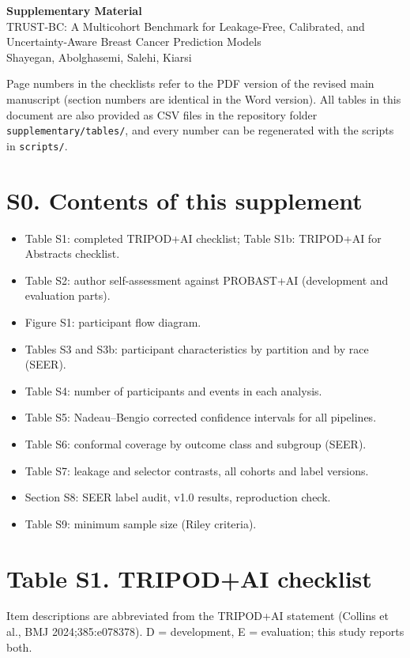\documentclass[10pt,a4paper]{article}
\begin{document}
\begin{center}
{\Large\bfseries Supplementary Material}\\[4pt]
{\large TRUST-BC: A Multicohort Benchmark for Leakage-Free, Calibrated, and Uncertainty-Aware Breast Cancer Prediction Models}\\[6pt]
Shayegan, Abolghasemi, Salehi, Kiarsi
\end{center}

\noindent Page numbers in the checklists refer to the PDF version of the revised main manuscript (section numbers are identical in the Word version). All tables in this document are also provided as CSV files in the repository folder \texttt{supplementary/tables/}, and every number can be regenerated with the scripts in \texttt{scripts/}.

\tableofcontents
\bigskip

\section*{S0. Contents of this supplement}
\begin{itemize}
\item Table S1: completed TRIPOD+AI checklist; Table S1b: TRIPOD+AI for Abstracts checklist.
\item Table S2: author self-assessment against PROBAST+AI (development and evaluation parts).
\item Figure S1: participant flow diagram.
\item Tables S3 and S3b: participant characteristics by partition and by race (SEER).
\item Table S4: number of participants and events in each analysis.
\item Table S5: Nadeau--Bengio corrected confidence intervals for all pipelines.
\item Table S6: conformal coverage by outcome class and subgroup (SEER).
\item Table S7: leakage and selector contrasts, all cohorts and label versions.
\item Section S8: SEER label audit, v1.0 results, reproduction check.
\item Table S9: minimum sample size (Riley criteria).
\end{itemize}

\newpage
\section*{Table S1. TRIPOD+AI checklist}
Item descriptions are abbreviated from the TRIPOD+AI statement (Collins et al., BMJ 2024;385:e078378). D = development, E = evaluation; this study reports both.
\end{document}
